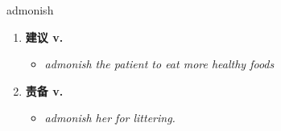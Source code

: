 
\begin{frame}
{\huge admonish}
\begin{center}
\begin{enumerate}\Large
  \item \textbf{建议 v.}
  \begin{itemize}
    \item \em{\Large{admonish the patient to eat more healthy foods}}
  \end{itemize}
  \item \textbf{责备 v.}
  \begin{itemize}
    \item \em{\Large{admonish her for littering.}}
  \end{itemize}
\end{enumerate}
\end{center}
\end{frame}
